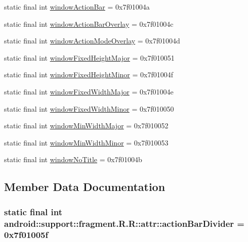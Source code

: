 \begin{CompactItemize}
\item 
static final int \hyperlink{classandroid_1_1support_1_1fragment_1_1_r_1_1attr_abf5cdc6977ff8a75e67aaa825c4f61a}{windowActionBar} = 0x7f01004a
\item 
static final int \hyperlink{classandroid_1_1support_1_1fragment_1_1_r_1_1attr_8046d0f70ad610298b4f9b42ee87309e}{windowActionBarOverlay} = 0x7f01004c
\item 
static final int \hyperlink{classandroid_1_1support_1_1fragment_1_1_r_1_1attr_44802a8ed606725dc7283cc8e00a35d7}{windowActionModeOverlay} = 0x7f01004d
\item 
static final int \hyperlink{classandroid_1_1support_1_1fragment_1_1_r_1_1attr_ab2180112e8fafc94426e8e0e184f635}{windowFixedHeightMajor} = 0x7f010051
\item 
static final int \hyperlink{classandroid_1_1support_1_1fragment_1_1_r_1_1attr_73af24801b7865576a1adffbb7dca71a}{windowFixedHeightMinor} = 0x7f01004f
\item 
static final int \hyperlink{classandroid_1_1support_1_1fragment_1_1_r_1_1attr_dd7289f5d965d3f42cb127c75701c33f}{windowFixedWidthMajor} = 0x7f01004e
\item 
static final int \hyperlink{classandroid_1_1support_1_1fragment_1_1_r_1_1attr_67a87765078337303d31060dd298999b}{windowFixedWidthMinor} = 0x7f010050
\item 
static final int \hyperlink{classandroid_1_1support_1_1fragment_1_1_r_1_1attr_d1b81253843a5fb82050ccb42329460e}{windowMinWidthMajor} = 0x7f010052
\item 
static final int \hyperlink{classandroid_1_1support_1_1fragment_1_1_r_1_1attr_9a03cf8abc4025e5be3c00693de1ed38}{windowMinWidthMinor} = 0x7f010053
\item 
static final int \hyperlink{classandroid_1_1support_1_1fragment_1_1_r_1_1attr_767b62ae1c0eae55cc723f3e95526231}{windowNoTitle} = 0x7f01004b
\end{CompactItemize}


\subsection{Member Data Documentation}
\hypertarget{classandroid_1_1support_1_1fragment_1_1_r_1_1attr_7b6ce764c69218cd53569252d8d4b8d8}{
\subsubsection[{actionBarDivider}]{\setlength{\rightskip}{0pt plus 5cm}static final int android::support::fragment.R.R::attr::actionBarDivider = 0x7f01005f}}
\label{classandroid_1_1support_1_1fragment_1_1_r_1_1attr_7b6ce764c69218cd53569252d8d4b8d8}


